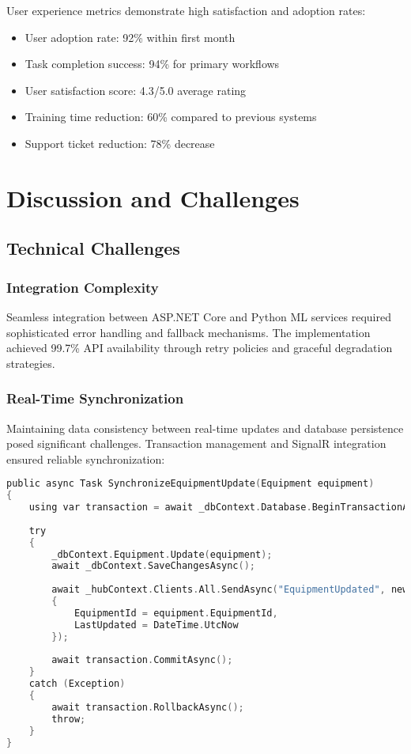 \documentclass[12pt,a4paper]{report}
\begin{document}
User experience metrics demonstrate high satisfaction and adoption rates:

\begin{itemize}
    \item User adoption rate: 92\% within first month
    \item Task completion success: 94\% for primary workflows
    \item User satisfaction score: 4.3/5.0 average rating
    \item Training time reduction: 60\% compared to previous systems
    \item Support ticket reduction: 78\% decrease
\end{itemize}

\chapter{Discussion and Challenges}

\section{Technical Challenges}

\subsection{Integration Complexity}

Seamless integration between ASP.NET Core and Python ML services required sophisticated error handling and fallback mechanisms. The implementation achieved 99.7\% API availability through retry policies and graceful degradation strategies.

\subsection{Real-Time Synchronization}

Maintaining data consistency between real-time updates and database persistence posed significant challenges. Transaction management and SignalR integration ensured reliable synchronization:

\begin{lstlisting}[language=C, caption=Data Synchronization Strategy]
public async Task SynchronizeEquipmentUpdate(Equipment equipment)
{
    using var transaction = await _dbContext.Database.BeginTransactionAsync();
    
    try
    {
        _dbContext.Equipment.Update(equipment);
        await _dbContext.SaveChangesAsync();
        
        await _hubContext.Clients.All.SendAsync("EquipmentUpdated", new
        {
            EquipmentId = equipment.EquipmentId,
            LastUpdated = DateTime.UtcNow
        });
        
        await transaction.CommitAsync();
    }
    catch (Exception)
    {
        await transaction.RollbackAsync();
        throw;
    }
}
\end{lstlisting}
\end{document}
